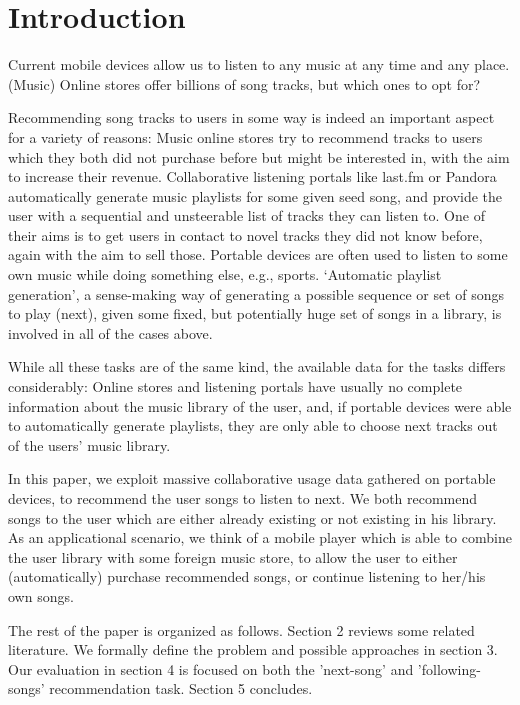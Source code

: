 \section{Introduction}
\label{sec:introduction}

Current mobile devices allow us to listen to any music at any time and any place.
(Music) Online stores offer billions of song tracks, but which ones to opt for?

Recommending song tracks to users in some way is indeed an important aspect for a variety of reasons:
Music online stores try to recommend tracks to users which they both did not purchase before but might be interested in, with the aim to increase their revenue.
Collaborative listening portals like last.fm or Pandora automatically generate music playlists for some given seed song, and provide the user with a sequential and unsteerable list of tracks they can listen to.
One of their aims is to get users in contact to novel tracks they did not know before, again with the aim to sell those.
Portable devices are often used to listen to some own music while doing something else, e.g., sports.
`Automatic playlist generation', a sense-making way of generating a possible sequence or set of songs to play (next), given some fixed, but potentially huge set of songs in a library, is involved in all of the cases above.

While all these tasks are of the same kind, the available data for the tasks differs considerably:
Online stores and listening portals have usually no complete information about the music library of the user, and, if portable devices were able to automatically generate playlists, they are only able to choose next tracks out of the users' music library.

In this paper, we exploit massive collaborative usage data gathered on portable devices, to recommend the user songs to listen to next.
We both recommend songs to the user which are either already existing or not existing in his library.
As an applicational scenario, we think of a mobile player which is able to combine the user library with some foreign music store, to allow the user to either (automatically) purchase recommended songs, or continue listening to her/his own songs.

The rest of the paper is organized as follows.
Section 2 reviews some related literature.
We formally define the problem and possible approaches in section 3.
Our evaluation in section 4 is focused on both the 'next-song' and 'following-songs' recommendation task.
Section 5 concludes.



%
%

